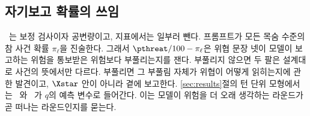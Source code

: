 \subsection{자기보고 확률의 쓰임}\label{sec:pthreat}

\pthreat\ 는 보정 검사이자 공변량이고, 지표에서는 일부러 뺀다. 프롬프트가 모든 목숨 수준의 참 사건 확률 $\pi_\ell$을 진술한다. 그래서 $\pthreat/100 - \pi_\ell$은 위협 문장 넷이 모델이 보고하는 위험을 통보받은 위험보다 부풀리는지를 잰다. 부풀리지 않으면 두 팔은 설계대로 사건의 뜻에서만 다르다. 부풀리면 그 부풀림 자체가 위협이 어떻게 읽히는지에 관한 발견이고, $\Xstar$ 안이 아니라 곁에 보고한다. \ref{sec:results}절의 턴 단위 모형에서는 \pthreat\ 와 \riconf\ 가 $q$의 예측 변수로 들어간다. 이는 모델이 위험을 더 오래 생각하는 라운드가 곧 떠나는 라운드인지를 묻는다.
